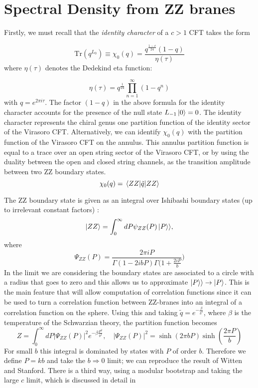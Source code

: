 \section{Spectral Density from ZZ branes}
Firstly, we must recall that the \textit{identity character} of a $c>1$ CFT takes the form

\begin{equation}
\text{Tr}(q^{L_0})\equiv \chi_0(q) = \frac{q^{\frac{1-c}{24}}(1-q)}{\eta(\tau)}
\end{equation}
where $\eta(\tau)$ denotes the Dedekind eta function:

\begin{equation}
\eta(\tau) = q^\frac{1}{24}\prod_{n=1}^\infty(1-q^n)
\end{equation}
 with $q=e^{2\pi i \tau}$. The factor $(1-q)$ in the above formula for the identity character accounts for the presence of the null state $L_{-1}\ket{0} = 0$. The identity character represents the chiral genus one partition function of the identity sector of the Virasoro CFT. Alternatively, we can identify $\chi_0(q)$ with the partition function of the Virasoro CFT on the annulus. This annulus partition function is equal to a trace over an open string sector of the Virasoro CFT, or by using the duality between the open and closed string channels, as the transition amplitude between two ZZ boundary states\cite{Fateev00,CardyCFT}.
 \begin{equation}
 \chi_0(q) = \mel{ZZ}{\tilde{q}}{ZZ}
 \end{equation}
\par
The ZZ boundary state is given as an integral over Ishibashi boundary states (up to irrelevant constant factors) \cite{Fateev00}:
\begin{equation}
\ket{ZZ} = \int_0^\infty dP\psi_{ZZ}(P)\ket{P}\rangle, 
\end{equation}
where
\begin{equation}
\Psi_{ZZ}(P) = \frac{2\pi i P}{\Gamma(1-2ibP)\Gamma(1+\frac{2iP}{b}})
\end{equation}
In the limit we are considering the boundary states are associated to a circle with a radius that goes to zero and this allows us to approximate $\ket{P}\rangle\rightarrow \ket{P}$. This is the main feature that will allow computation of correlation functions since it can be used to turn a correlation function between ZZ-branes into an integral of a correlation function on the sphere. Using this and taking $\tilde{q} = e^{-\frac{\beta}{b^2}}$, where $\beta$ is the temperature of the Schwarzian theory, the partition function becomes
\begin{equation}
Z = \int_0^\infty dP\vert\Psi_{ZZ}(P)\vert^2e^{-\beta\frac{P^2}{b^2}}, \quad \vert\Psi_{ZZ}(P)\vert^2 = \sinh(2\pi b P)\sinh(\frac{2\pi P}{b})
\end{equation}
For small $b$ this integral is dominated by states with $P$ of order $b$. Therefore we define $P=kb$ and take the $b\Rightarrow 0$ limit; we can reproduce the result of Witten and Stanford. There is a third way, using a modular bootstrap and taking the large $c$ limit, which is discussed in detail in \cite{Mertens17}
